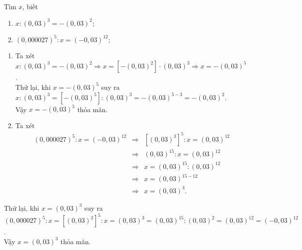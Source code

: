 \begin{bt}%
	Tìm $x$, biết
	\begin{enumerate}
		\item $x\colon \left(0{,}03\right)^3 =  - \left(0{,}03\right)^2$;
		\item $\left(0{,}000027\right)^5\colon x =  \left(- 0{,}03\right)^{12}$;
	\end{enumerate}
	\loigiai
	{\begin{enumerate}
			\item Ta xét $x\colon \left(0{,}03\right)^3 =  - \left(0{,}03\right)^2\Rightarrow x =  \left[- \left(0{,}03\right)^2\right]\cdot \left(0{,}03\right)^3\Rightarrow x = - \left(0{,}03\right)^5$.\\
			Thử lại, khi $x = - \left(0{,}03\right)^5$ suy ra\\
			$x\colon \left(0{,}03\right)^3 = \left[- \left(0{,}03\right)^5\right]\colon \left(0{,}03\right)^3 = - \left(0{,}03\right)^{5 - 3} = - \left(0{,}03\right)^{2}$.\\
			Vậy $x = - \left(0{,}03\right)^5$ thỏa mãn.
			\item Ta xét 
			\begin{eqnarray*}
				\left(0{,}000027\right)^5\colon x =  \left(- 0{,}03\right)^{12}&\Rightarrow& \left[\left(0{,}03\right)^3\right]^5\colon x =  \left(0{,}03\right)^{12}\\
				&\Rightarrow& \left(0{,}03\right)^{15}\colon x =  \left(0{,}03\right)^{12}\\
				&\Rightarrow& x = \left(0{,}03\right)^{15}\colon  \left(0{,}03\right)^{12}\\
				&\Rightarrow& x = \left(0{,}03\right)^{15 - 12}\\
				&\Rightarrow& x = \left(0{,}03\right)^{3}.
			\end{eqnarray*}
		\end{enumerate}
		Thử lại, khi $ x = \left(0{,}03\right)^{3}$ suy ra\\
		$\left(0{,}000027\right)^5\colon x = \left[\left(0{,}03\right)^3\right]^5\colon  x = \left(0{,}03\right)^{3} =  \left(0{,}03\right)^{15}\colon \left(0{,}03\right)^2 = \left(0{,}03\right)^{12} = \left(- 0{,}03\right)^{12}$.\\
		Vậy $x = \left(0{,}03\right)^{3}$ thỏa mãn.
	}
\end{bt}

